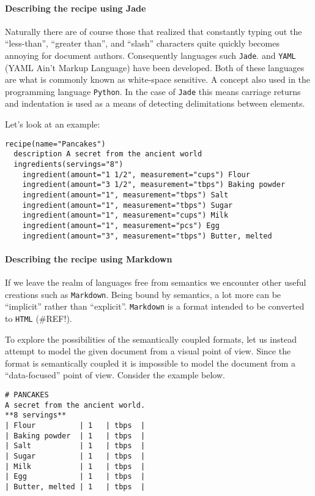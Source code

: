 \documentclass{scrreprt}
\begin{document}
\paragraph{Describing the recipe using Jade}
Naturally there are of course those that realized that constantly typing out the ``less-than'', ``greater than'', and ``slash'' characters quite quickly becomes annoying for document authors. Consequently languages such \texttt{Jade}. and \texttt{YAML} (YAML Ain't Markup Language) have been developed. Both of these languages are what is commonly known as white-space sensitive. A concept also used in the programming language \texttt{Python}. In the case of \texttt{Jade} this means carriage returns and indentation is used as a means of detecting delimitations between elements.

Let's look at an example:

\begin{lstlisting}
recipe(name="Pancakes")
  description A secret from the ancient world
  ingredients(servings="8")
    ingredient(amount="1 1/2", measurement="cups") Flour
    ingredient(amount="3 1/2", measurement="tbps") Baking powder
    ingredient(amount="1", measurement="tbps") Salt
    ingredient(amount="1", measurement="tbps") Sugar
    ingredient(amount="1", measurement="cups") Milk
    ingredient(amount="1", measurement="pcs") Egg
    ingredient(amount="3", measurement="tbps") Butter, melted
\end{lstlisting}



\paragraph{Describing the recipe using Markdown}
If we leave the realm of languages free from semantics we encounter other useful creations such as \texttt{Markdown}. Being bound by semantics, a lot more can be ``implicit'' rather than ``explicit''. \texttt{Markdown} is a format intended to be converted to \texttt{HTML} (\#REF!).

To explore the possibilities of the semantically coupled formats, let us instead attempt to model the given document from a visual point of view. Since the format is semantically coupled it is impossible to model the document from a ``data-focused'' point of view. Consider the example below.
\begin{lstlisting}
# PANCAKES
A secret from the ancient world.
**8 servings**
| Flour          | 1   | tbps  |
| Baking powder  | 1   | tbps  |
| Salt           | 1   | tbps  |
| Sugar          | 1   | tbps  |
| Milk           | 1   | tbps  |
| Egg            | 1   | tbps  |
| Butter, melted | 1   | tbps  |
\end{lstlisting}
\end{document}
